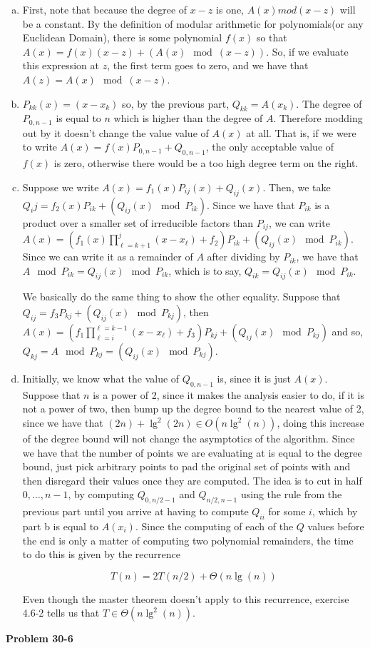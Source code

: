 \documentclass{article}
\begin{document}
\begin{enumerate}[a.]
\item
First, note that because the degree of $x-z$ is one, $A(x)mod(x-z)$ will be a constant. By the definition of modular arithmetic for polynomials(or any Euclidean Domain), there is some polynomial $f(x)$ so that $A(x) = f(x)(x-z) + (A(x) \mod(x-z))$. So, if we evaluate this expression at $z$, the first term goes to zero, and we have that $A(z) = A(x)\mod (x-z)$.
\item
$P_{kk}(x) = (x-x_k)$ so, by the previous part, $Q_{kk} = A(x_k)$. The degree of $P_{0,n-1}$ is equal to $n$ which is higher than the degree of $A$. Therefore modding out by it doesn't change the value value of $A(x)$ at all. That is, if we were to write $A(x) = f(x) P_{0,n-1} + Q_{0,n-1}$, the only acceptable value of $f(x)$ is zero, otherwise there would be a too high degree term on the right.
\item
Suppose we write $A(x) = f_1(x) P_{ij}(x) +Q_{ij}(x)$. Then, we take $Q_ij = f_2(x) P_{ik} + (Q_{ij}(x) \mod P_{ik})$. Since we have that $P_{ik}$ is a product over a smaller set of irreducible factors than $P_{ij}$, we can write $A(x) =(f_1(x)\prod_{\ell = k+1}^j (x-x_\ell) + f_2) P_{ik} + (Q_{ij}(x) \mod P_{ik})$. Since we can write it as a remainder of $A$ after dividing by $P_{ik}$, we have that $A \mod P_{ik} =  Q_{ij}(x) \mod P_{ik}$, which is to say,  $Q_{ik} =  Q_{ij}(x) \mod P_{ik}$.

We basically do the same thing to show the other equality. Suppose that $Q_{ij} = f_3 P_{kj} +   (Q_{ij}(x) \mod P_{kj})$, then $A(x) = (f_1\prod_{\ell =i}^{\ell = k-1} (x-x_\ell) + f_3)P_{kj} +  (Q_{ij}(x) \mod P_{kj})$ and so, $Q_{kj} = A \mod P_{kj} =  (Q_{ij}(x) \mod P_{kj})$.

\item
Initially, we know what the value of $Q_{0,n-1}$ is, since it is just $A(x)$. Suppose that $n$ is a power of 2, since it makes the analysis easier to do, if it is not a power of two, then bump up the degree bound to the nearest value of 2, since we have that $(2n) + \lg^2(2n) \in O(n\lg^2(n))$, doing this increase of the degree bound will not change the asymptotics of the algorithm. Since we have that the number of points we are evaluating at is equal to the degree bound, just pick arbitrary points to pad the original set of points with and then disregard their values once they are computed. The idea is to cut in half $0,\ldots,n-1$, by computing $Q_{0,n/2-1}$ and $Q_{n/2,n-1}$ using the rule from the previous part until you arrive at having to compute $Q_{ii}$ for some $i$, which by part b is equal to $A(x_i)$. Since the computing of each of the $Q$ values before the end is only a matter of computing two polynomial remainders, the time to do this is given by the recurrence

\[
T(n) = 2 T(n/2) +\Theta(n\lg(n))
\]

 Even though the master theorem doesn't apply to this recurrence, exercise 4.6-2 tells us that $T\in \Theta(n\lg^2(n))$.


\end{enumerate}

\noindent\textbf{Problem 30-6}\\

\end{document}
